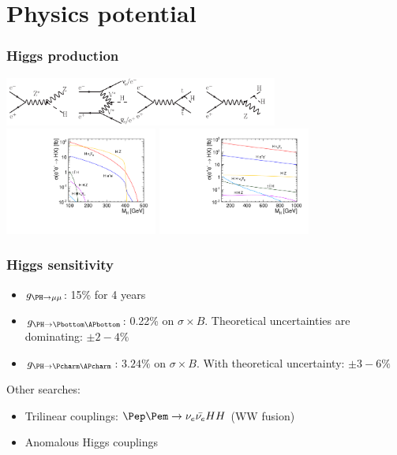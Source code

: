 \documentclass{beamer}
\begin{document}
\section{Physics potential}
\begin{frame}
\frametitle{Higgs production}
\begin{center}
\includegraphics[width=9cm]{higgs_production.pdf}\\
\includegraphics[width=5cm]{xsec_vs_Hmass_sqrts500.pdf}
\includegraphics[width=5cm]{xsec_vs_Hmass_sqrts3000.pdf}
\end{center}
\end{frame}
\begin{frame}
\frametitle{Higgs sensitivity}
\begin{itemize}
  \item $g_{\PH\to\mu\mu}$: 15\% for 4 years
  \item  $g_{\PH\to\Pbottom\APbottom}$: 0.22\% on $\sigma\times B$. Theoretical
  uncertainties are dominating: $\pm2-4\%$
  \item $g_{\PH\to\Pcharm\APcharm}$: $3.24\%$ on $\sigma\times B$. With
  theoretical uncertainty: $\pm3-6\%$
\end{itemize}
Other searches:
\begin{itemize}
  \item Trilinear couplings: $\Pep\Pem\to\nu_e\bar{\nu_e}HH$ (WW fusion)
  \item Anomalous Higgs couplings
\end{itemize}
\end{frame}
\end{document}
